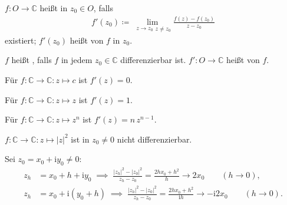 \begin{theorem}[Definition]
  \begin{enum-arab}
    \item $f : O \to \mathbb{C}$ heißt  in $z_0 \in O$, falls
    \begin{align*}
      f'(z_0) \coloneq \lim\limits_{\substack{z \to z_0}{z \neq z_0}} \frac{f(z) - f(z_0)}{z - z_0}
    \end{align*}
    existiert; $f'(z_0)$ heißt  von $f$ in $z_0$.
    
    \item $f$ heißt , falls $f$ in jedem $z_0 \in \mathbb{C}$ differenzierbar ist. $f' : O \to \mathbb{C}$ heißt  von $f$.
  \end{enum-arab}
\end{theorem}

\begin{example} \label{thm:1.23}
  \begin{enum-arab}
    \item Für $f : \mathbb{C} \to \mathbb{C} : z \mapsto c$ ist $f'(z)=0$.
    
    \item Für $f : \mathbb{C} \to \mathbb{C} : z \mapsto z$ ist $f'(z)=1$.
    
    \item Für $f : \mathbb{C} \to \mathbb{C} : z \mapsto z^n$ ist $f'(z)=n \, z^{n-1}$.
    
    \item $f : \mathbb{C} \to \mathbb{C} : z \mapsto |z|^2$ ist in $z_0 \neq 0$ nicht differenzierbar.
    
    Sei $z_0 = x_0 + \mathrm{i} y_0 \neq 0$:
    \begin{align*}
      z_h &= x_0 + h + \mathrm{i} y_0 \; \implies \; \frac{|z_h|^2 - |z_0|^2}{z_h - z_0} = \frac{2 h x_0 + h^2}{h} \to 2 x_0 \qquad (h \to 0),\\
      z_h &= x_0 + \mathrm{i} (y_0 + h) \; \implies \; \frac{|z_h|^2 - |z_0|^2}{z_h - z_0} = \frac{2 h x_0 + h^2}{\mathrm{i} h} \to - \mathrm{i} 2 x_0 \qquad (h \to 0).
    \end{align*}
  \end{enum-arab}
\end{example}


